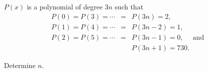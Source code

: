 $P(x)$ is a polynomial of degree $3n$ such that\begin{eqnarray*}

P(0) = P(3) = \cdots &=& P(3n) = 2, \\

P(1) = P(4) = \cdots &=& P(3n-2) = 1, \\

P(2) = P(5) = \cdots &=& P(3n-1) = 0, \quad\text{ and }\\

&& P(3n+1) = 730.\end{eqnarray*}

Determine $n$.